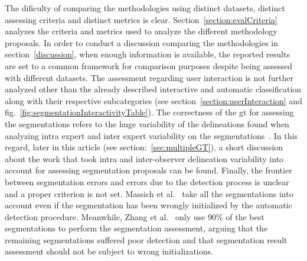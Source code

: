 The dificulty of comparing the methodologies using distinct datasets, distinct assessing criteria and distinct metrics is clear. 
Section~\ref{section:evalCriteria} analyzes the criteria and metrics used to analyze the different methodology proposals. In order to conduct a discussion comparing the methodologies in section~\ref{discussion}, when enough information is available, the reported results are set to a common framework for comparison purposes despite being assessed with different datasets.
The assessment regarding user interaction is not further analyzed other than the already described interactive and automatic classification along with their respective subcategories (see section~\ref{section:userInteraction} and fig.~\ref{fig:segmentationInteractivityTable}). 
The correctness of the \ac{gt} for assessing the segmentations refers to the huge variability of the delineations found when analyzing intra expert and inter expert variability on the segmentations~\cite{gerard2013}. In this regard, later in this article (see section:~\ref{sec:multipleGT}), a short discussion about the work that took intra and inter-observer delineation variability into account for assessing segmentation proposals can be found. 
Finally, the frontier between segmentation errors and errors due to the detection process is unclear and a proper criterion is not set. Massich et al.~\cite{massich2010lesion} take all the segmentations into account even if the segmentation has been wrongly initialized by the automatic detection procedure. Meanwhile, Zhang et al.~\cite{Zhang:2010p14317} only use 90\% of the best segmentations to perform the segmentation assessment, arguing that the remaining segmentations suffered poor detection and that segmentation result assessment should not be subject to wrong initializations.


